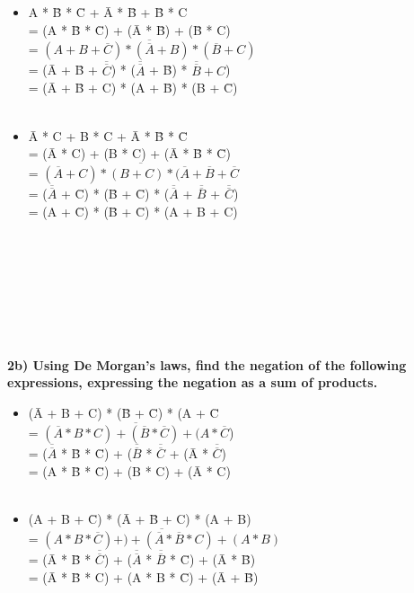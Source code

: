 \documentclass{article}
\begin{document}
\begin{itemize}
\item A * \={B} * \={C} + \={A} * \={B} + \={B} * C
\\
= (A * \={B} * \={C}) + (\={A} * \={B}) + (\={B} * C) 
\\
= $\overline{(A + B + \overline{C}) * (\overline{A} + B) * (\overline{B} + C)}$
\\
= (\={A} + \={B} + $\overline{\overline{C}}$) * ($\overline{\overline{A}}$ + \={B}) * $\overline{\overline{B}} + C$)
\\
= (\={A} + \={B} + C) * (A + \={B}) * (B + \={C})   
\\
\\
\item \={A} * C + B * C + \={A} * \={B} * \={C}
\\
= (\={A} * C) + (B * C) + (\={A} * \={B} * \={C})
\\
= $\overline{(\overline{A} + C) * (B + C) * (\overline{A} + \overline{B} + \overline{C}}$
\\
= ($\overline{\overline{A}}$ + \={C}) * (\={B} + \={C}) * ($\overline{\overline{A}}$ + $\overline{\overline{B}}$ + $\overline{\overline{C}}$)  
\\
= (A + \={C}) * (\={B} + \={C}) * (A + B + C)
\\
\\
\\
\\
\\
\\
\\
\\ 
\end{itemize}
\textbf{2b) Using De Morgan's laws, find the negation of the following expressions, expressing the negation as a sum of products.}
\begin{itemize}
\item (\={A} + B + C) * (\={B} + \={C}) * (A + \={C}
\\
= $\overline{(\overline{A} * B * C) + (\overline{B} * \overline{C}) + (A * \overline{C}}$) 
\\
= ($\overline{\overline{A}}$ * \={B} * \={C}) + ($\overline{\overline{B}}$ * $\overline{\overline{C}}$ + (\={A} * $\overline{\overline{C}}$) 
\\
= (A * \={B} * \={C}) + (B * C) + (\={A} * C) 
\\
\\
\item (A + B + \={C}) * (\={A} + \={B} + C) * (A + B)
\\
= $\overline{(A * B * \overline{C}) + ) + (\overline{A} * \overline{B} * C) + (A * B)}$
\\
= (\={A} * \={B} * $\overline{\overline{C}}$) + ($\overline{\overline{A}}$ * $\overline{\overline{B}}$ * \={C}) + (\={A} * \={B})
\\
= (\={A} * \={B} * C) + (A * B * \={C}) + (\={A} + \={B})       
\end{itemize}
\end{document}
